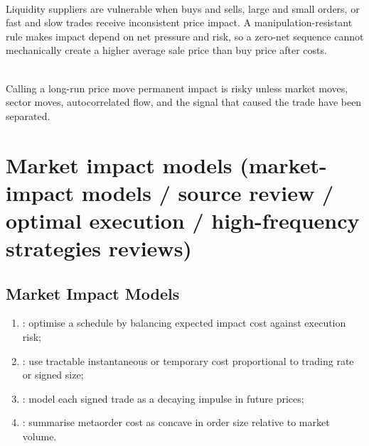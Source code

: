 \documentclass[a4paper,oneside,openany]{book}
\begin{document}
\begin{principle} \\
Liquidity suppliers are vulnerable when buys and sells, large and small orders, or fast and slow trades receive inconsistent price impact. A manipulation-resistant rule makes impact depend on net pressure and risk, so a zero-net sequence cannot mechanically create a higher average sale price than buy price after costs.
\end{principle}

\begin{caveat} \\
Calling a long-run price move permanent impact is risky unless market moves, sector moves, autocorrelated flow, and the signal that caused the trade have been separated.
\end{caveat}

\section*{Market impact models (market-impact models / source review / optimal execution / high-frequency strategies reviews)}

\subsection*{Market Impact Models}

\begin{taxonomy} 
\begin{enumerate}[label=\roman*.]
\setlength{\itemsep}{0pt}
\item {}: optimise a schedule by balancing expected impact cost against execution risk;
\item {}: use tractable instantaneous or temporary cost proportional to trading rate or signed size;
\item {}: model each signed trade as a decaying impulse in future prices;
\item {}: summarise metaorder cost as concave in order size relative to market volume.
\end{enumerate}
\end{taxonomy}
\end{document}
